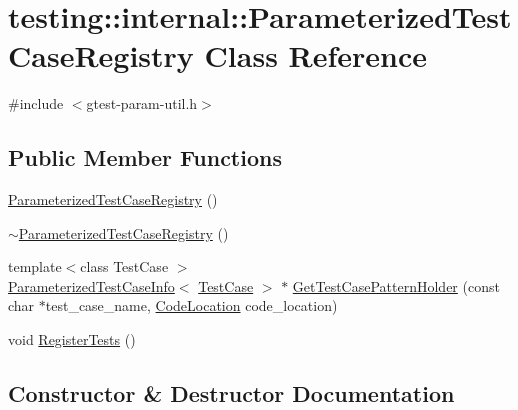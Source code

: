 \hypertarget{classtesting_1_1internal_1_1ParameterizedTestCaseRegistry}{}\section{testing\+::internal\+::Parameterized\+Test\+Case\+Registry Class Reference}
\label{classtesting_1_1internal_1_1ParameterizedTestCaseRegistry}


{\ttfamily \#include $<$gtest-\/param-\/util.\+h$>$}

\subsection*{Public Member Functions}
\begin{DoxyCompactItemize}
\item 
\mbox{\hyperlink{classtesting_1_1internal_1_1ParameterizedTestCaseRegistry_aacafaaf78ca09bbd9f5eed93ae2b6225}{Parameterized\+Test\+Case\+Registry}} ()
\item 
\mbox{\hyperlink{classtesting_1_1internal_1_1ParameterizedTestCaseRegistry_a695c86db8545a3745873190b91a13c9f}{$\sim$\+Parameterized\+Test\+Case\+Registry}} ()
\item 
{\footnotesize template$<$class Test\+Case $>$ }\\\mbox{\hyperlink{classtesting_1_1internal_1_1ParameterizedTestCaseInfo}{Parameterized\+Test\+Case\+Info}}$<$ \mbox{\hyperlink{classtesting_1_1TestCase}{Test\+Case}} $>$ $\ast$ \mbox{\hyperlink{classtesting_1_1internal_1_1ParameterizedTestCaseRegistry_af525816aa348f9e33f5d900965991388}{Get\+Test\+Case\+Pattern\+Holder}} (const char $\ast$test\+\_\+case\+\_\+name, \mbox{\hyperlink{structtesting_1_1internal_1_1CodeLocation}{Code\+Location}} code\+\_\+location)
\item 
void \mbox{\hyperlink{classtesting_1_1internal_1_1ParameterizedTestCaseRegistry_ad5b63c8fe94f3d51d039a76c001c9223}{Register\+Tests}} ()
\end{DoxyCompactItemize}


\subsection{Constructor \& Destructor Documentation}
\mbox{\label{classtesting_1_1internal_1_1ParameterizedTestCaseRegistry_aacafaaf78ca09bbd9f5eed93ae2b6225}} 

